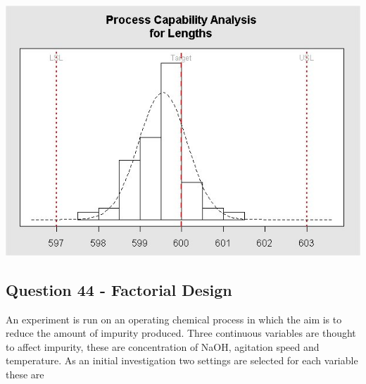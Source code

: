 \documentclass[a4paper,12pt]{article}
\begin{document}
\begin{center}
	\includegraphics[scale=0.55]{images/ExamQ4hist}
\end{center}
\newpage
%
%
%
\subsection*{Question 44 - Factorial Design}
An experiment is run on an operating chemical process in which the aim is to reduce the
amount of impurity produced. Three continuous variables are thought to affect impurity,
these are concentration of NaOH, agitation speed and temperature. As an initial investigation two settings are selected for each variable these are
\end{document}
